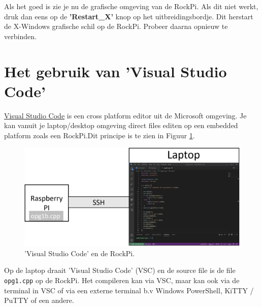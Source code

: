 \newline
Als het goed is zie je nu de grafische omgeving van de RockPi. Als dit niet werkt, druk dan eens op de \textbf{'Restart\_X'} knop op het uitbreidingsbordje. Dit herstart de X-Windows grafische schil op de RockPi. Probeer daarna opnieuw te verbinden.

	

\section{Het gebruik van 'Visual Studio Code'} \label{app:vsc}
\label{sec:vsc}
\href{https://code.visualstudio.com/docs}{Visual Studio Code} is een cross platform editor uit de Microsoft omgeving. Je kan vanuit je laptop/desktop omgeving direct files editen op een embedded platform zoals een RockPi.Dit principe is te zien in Figuur \ref{fig:winVCS}.
	\begin{figure}[h!]
	\captionsetup{justification=centering}
	\includegraphics[width=0.65 \linewidth]{figuren/laptopVCS}
	\centering
	\caption{'Visual Studio Code' en de RockPi.}
	\label{fig:winVCS}
\end{figure}
Op de laptop draait 'Visual Studio Code' (VSC) en de source file is de file \texttt{opg1.cpp} op de RockPi. Het compileren kan via VSC, maar kan ook via de terminal in VSC of via een externe terminal b.v Windows PowerShell, KiTTY / PuTTY of een andere.
 

